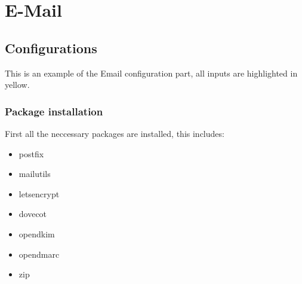 \section{E-Mail}
 \subsection{Configurations}
 This is an example of the Email configuration part, all inputs are highlighted in yellow.

 \subsubsection{Package installation}
 First all the neccessary packages are installed, this includes:
 \begin{itemize}
 \item{postfix}
 \item{mailutils}
 \item{letsencrypt}
 \item{dovecot}
 \item{opendkim}
 \item{opendmarc}
 \item{zip}
 \end{itemize}
